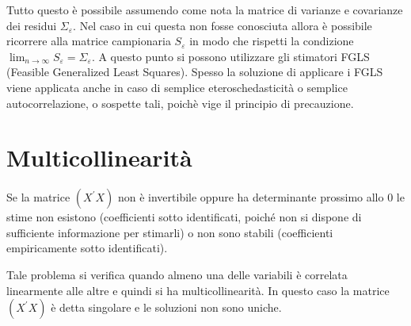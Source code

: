 \documentclass[a4page, 11pt]{article} %
\begin{document}
Tutto questo è possibile assumendo come nota la matrice di varianze e covarianze dei residui $\Sigma_\varepsilon$. Nel caso in cui questa non fosse conosciuta allora è possibile ricorrere alla matrice campionaria $S_\varepsilon$ in modo che rispetti la condizione $\lim_{n\to \infty}{S_\varepsilon = \Sigma_\varepsilon}$. A questo punto si possono utilizzare gli stimatori FGLS (Feasible Generalized Least Squares). Spesso la soluzione di applicare i FGLS viene applicata anche in caso di semplice eteroschedasticità o semplice autocorrelazione, o sospette tali, poichè vige il principio di precauzione.

\section{Multicollinearità }

Se la matrice $(X^{\prime} X)$ non è invertibile oppure ha determinante prossimo allo 0 le stime non esistono (coefficienti sotto identificati, poiché non si dispone di sufficiente informazione per stimarli) o non sono stabili (coefficienti empiricamente sotto identificati).

Tale problema si verifica quando almeno una delle variabili è correlata linearmente alle altre e quindi si ha multicollinearità. In questo caso la matrice $(X^{\prime} X)$ è detta singolare e le soluzioni non sono uniche. 
\end{document}
